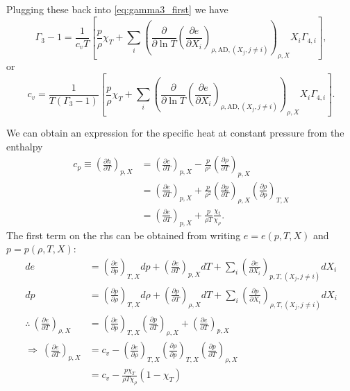 Plugging these back into \eqref{eq:gamma3_first} we have
\begin{equation}\label{eq:gamma3_second}
  \Gamma_3-1 = \frac{1}{c_vT}\left[\frac{p}{\rho}\chi_T +\sum_i
    \left(\frac{\partial}{\partial\ln T}\left(
    \frac{\partial e}{\partial X_i}\right)_{\rho,\text{AD},(X_j,j\neq i)}
    \right)_{\rho,X}X_i
    \Gamma_{4,i}\right],
\end{equation}
or
\begin{equation}\label{eq:cv}
  c_v = \frac{1}{T(\Gamma_3-1)}\left[\frac{p}{\rho}\chi_T +\sum_i
    \left(\frac{\partial}{\partial\ln T}\left(
    \frac{\partial e}{\partial X_i}\right)_{\rho,\text{AD},(X_j,j\neq i)}
    \right)_{\rho,X}X_i
    \Gamma_{4,i}\right].
\end{equation}

We can obtain an expression for the specific heat at constant pressure 
from the enthalpy
\begin{align*}
  c_p \equiv \left(\frac{\partial h}{\partial T}\right)_{p,X} &=
  \left(\frac{\partial e}{\partial T}\right)_{p,X} - \frac{p}{\rho^2}
  \left(\frac{\partial \rho}{\partial T}\right)_{p,X}\\
  &= \left(\frac{\partial e}{\partial T}\right)_{p,X} + \frac{p}{\rho^2}
  \left(\frac{\partial p}{\partial T}\right)_{\rho,X}
  \left(\frac{\partial \rho}{\partial p}\right)_{T,X}\\
  &=\left(\frac{\partial e}{\partial T}\right)_{p,X} + \frac{p}{\rho T}
  \frac{\chi_t}{\chi_\rho}.
\end{align*}
The first term on the rhs can be obtained from writing $e=e(p,T,X)$ and
$p=p(\rho,T,X)$:
\begin{align*}
  de &= \left(\frac{\partial e}{\partial p}\right)_{T,X}dp
  + \left(\frac{\partial e}{\partial T}\right)_{p,X}dT +
  \sum_i \left(\frac{\partial e}{\partial X_i}\right)_{p,T,(X_j,j\neq i)}
  dX_i\\
  dp &= \left(\frac{\partial p}{\partial \rho}\right)_{T,X}d\rho +
  \left(\frac{\partial p}{\partial T}\right)_{\rho,X}dT + \sum_i 
  \left(\frac{\partial p}{\partial X_i}\right)_{\rho,T,(X_j,j\neq i)}dX_i\\
  \therefore \ \left(\frac{\partial e}{\partial T}\right)_{\rho,X} &= 
  \left(\frac{\partial e}{\partial p}\right)_{T,X}
  \left(\frac{\partial p}{\partial T}\right)_{\rho,X} + 
  \left(\frac{\partial e}{\partial T}\right)_{p,X}\\
  \Rightarrow \ \left(\frac{\partial e}{\partial T}\right)_{p,X} &= c_v -
  \left(\frac{\partial e}{\partial \rho}\right)_{T,X}
  \left(\frac{\partial \rho}{\partial p}\right)_{T,X}
  \left(\frac{\partial p}{\partial T}\right)_{\rho,X}\\
  &= c_v - \frac{p\chi_T}{\rho T\chi_\rho}\left(1-\chi_T\right)
\end{align*}
